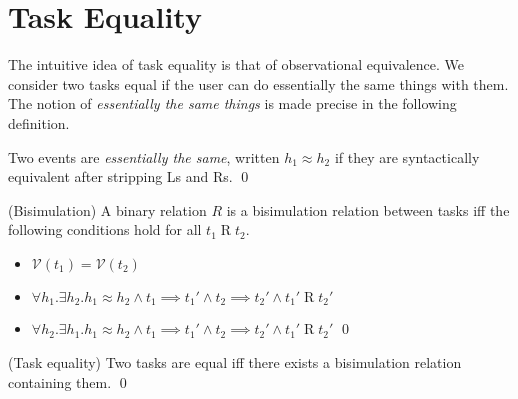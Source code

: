 
\section{Task Equality}

The intuitive idea of task equality is that of observational equivalence.
We consider two tasks equal if the user can do essentially the same things with them.
The notion of \emph{essentially the same things} is made precise in the following definition.

\begin{definition}
Two events are \emph{essentially the same}, written $h_1 \approx h_2$ if they are syntactically equivalent after stripping Ls and Rs. \qed
\end{definition}

\begin{definition}
(Bisimulation) A binary relation $R$ is a bisimulation relation between tasks iff the following conditions hold for all $t_1 \mathrel{R} t_2$.
\begin{itemize}
\item $\mathcal{V}(t_1) = \mathcal{V}(t_2)$
\item $\forall h_1 . \exists h_2 . h_1 \approx h_2 \wedge t_1 \implies t_1' \wedge t_2 \implies t_2' \wedge t_1' \mathrel{R} t_2'$
\item $\forall h_2 . \exists h_1 . h_1 \approx h_2 \wedge t_1 \implies t_1' \wedge t_2 \implies t_2' \wedge t_1' \mathrel{R} t_2'$ \qed
\end{itemize}
\end{definition}

\begin{definition}
(Task equality) Two tasks are equal iff there exists a bisimulation relation containing them. \qed
\end{definition}

